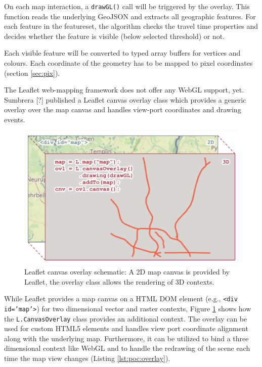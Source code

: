 
      On each map interaction, a \texttt{drawGL()} call will be triggered by the overlay. This function reads the underlying GeoJSON and extracts all geographic features. For each feature in the featureset, the algorithm checks the travel time properties and decides whether the feature is visible (below selected threshold) or not.\par
      Each visible feature will be converted to typed array buffers for vertices and colours. Each coordinate of the geometry has to be mapped to pixel coordinates (section \ref{sec:pix}).\par
      The Leaflet web-mapping framework does not offer any WebGL support, yet. Sumbrera [?] published a Leaflet canvas overlay class which provides a generic overlay over the map canvas and handles view-port coordinates and drawing events.\par
      \begin{figure}[h]
        \centering
        \includegraphics[width=0.7\linewidth]{./img/leaflet-canvas-overlay.pdf}
        \caption{Leaflet canvas overlay schematic: A 2D map canvas is provided by Leaflet, the overlay class allows the rendering of 3D contexts.}
        \label{fig:poc:overlay}
      \end{figure}
      
      While Leaflet provides a map canvas on a HTML DOM element (e.g., \texttt{<div id='map'>}) for two dimensional vector and raster contexts, Figure \ref{fig:poc:overlay} shows how the \texttt{L.CanvasOverlay} class provides an additional context. The overlay can be used for custom HTML5 elements and handles view port coordinate alignment along with the underlying map. Furthermore, it can be utilized to bind a three dimensional context like WebGL and to handle the redrawing of the scene each time the map view changes (Listing \ref{lst:poc:overlay}).\par
